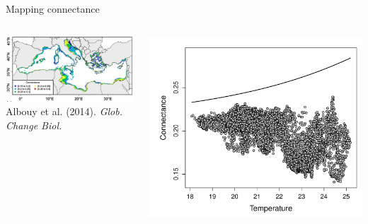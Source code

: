 \documentclass{eecslides}
\begin{document}
	\begin{frame}{Mapping connectance}
 	    	\begin{columns}
			\begin{column}{0.55\textwidth}							
				\begin{center}
					\includegraphics[height=0.38\textheight]{med_connectance}\\
					\footnotesize{Albouy et al. (2014). \textit{Glob. Change Biol.}}
				\end{center}
			\end{column}
			\begin{column}{0.45\textwidth}
				\begin{center}
					\includegraphics[height=0.43\textheight]{ConnectanceTempSDM}\\
				\end{center}
			\end{column}				
		\end{columns}	   
	\end{frame}
\end{document}
